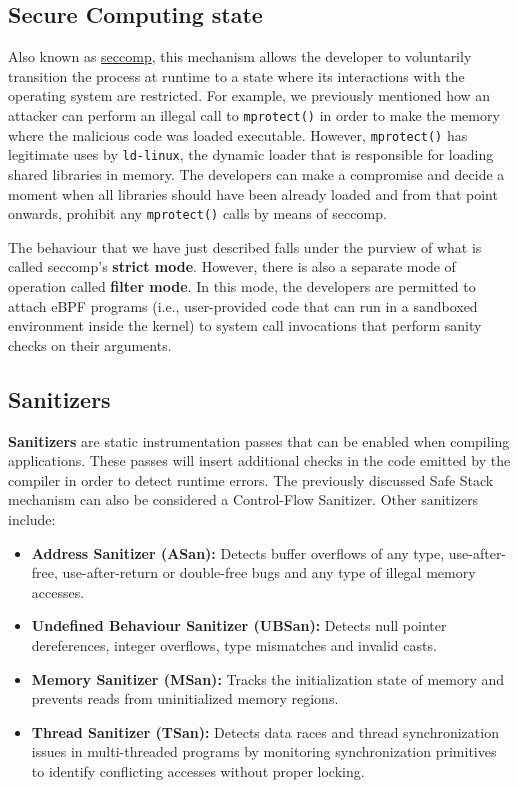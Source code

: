 \subsection{Secure Computing state}

Also known as \href{https://www.man7.org/linux/man-pages/man2/seccomp.2.html}{seccomp},
this mechanism allows the developer to voluntarily transition the process at
runtime to a state where its interactions with the operating system are
restricted. For example, we previously mentioned how an attacker can perform
an illegal call to \texttt{mprotect()} in order to make the memory where the
malicious code was loaded executable. However, \texttt{mprotect()} has legitimate
uses by \texttt{ld-linux}, the dynamic loader that is responsible for loading
shared libraries in memory. The developers can make a compromise and decide a
moment when all libraries should have been already loaded and from that point
onwards, prohibit any \texttt{mprotect()} calls by means of seccomp.

The behaviour that we have just described falls under the purview of what is
called seccomp's \textbf{strict mode}. However, there is also a separate mode
of operation called \textbf{filter mode}. In this mode, the developers are
permitted to attach eBPF programs (i.e., user-provided code that can run in a
sandboxed environment inside the kernel) to system call invocations that perform
sanity checks on their arguments.

\subsection{Sanitizers}

\textbf{Sanitizers} are static instrumentation passes that can be enabled when
compiling applications. These passes will insert additional checks in the
code emitted by the compiler in order to detect runtime errors. The previously
discussed Safe Stack mechanism can also be considered a Control-Flow Sanitizer.
Other sanitizers include:

\begin{itemize}
    \item \textbf{Address Sanitizer (ASan):} Detects buffer overflows of any
          type, use-after-free, use-after-return or double-free bugs and any
          type of illegal memory accesses.
    \item \textbf{Undefined Behaviour Sanitizer (UBSan):} Detects null pointer
          dereferences, integer overflows, type mismatches and invalid casts.
    \item \textbf{Memory Sanitizer (MSan):} Tracks the initialization state of
          memory and prevents reads from uninitialized memory regions.
    \item \textbf{Thread Sanitizer (TSan):} Detects data races and thread
          synchronization issues in multi-threaded programs by monitoring
          synchronization primitives to identify conflicting accesses without
          proper locking.
\end{itemize}

